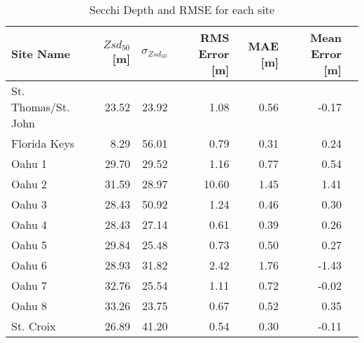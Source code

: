 \begin{table}
    \centering
    \caption{Secchi Depth and RMSE for each site}
    \label{tab:ocean_color_summary_by_site}
    \begin{tabular}{lrrrrrr}
        \toprule
        {}                  
        Site Name           & $Zsd_{50}$[m] & $\sigma_{Zsd_{50}}$ & RMS Error [m] & MAE [m] & Mean Error [m] \\
        \midrule
        St. Thomas/St. John & 23.52         & 23.92                  & 1.08          & 0.56    & -0.17          \\
        Florida Keys        & 8.29          & 56.01                  & 0.79          & 0.31    & 0.24           \\
        Oahu 1              & 29.70         & 29.52                  & 1.16          & 0.77    & 0.54           \\
        Oahu 2              & 31.59         & 28.97                  & 10.60         & 1.45    & 1.41           \\
        Oahu 3              & 28.43         & 50.92                  & 1.24          & 0.46    & 0.30           \\
        Oahu 4              & 28.43         & 27.14                  & 0.61          & 0.39    & 0.26           \\
        Oahu 5              & 29.84         & 25.48                  & 0.73          & 0.50    & 0.27           \\
        Oahu 6              & 28.93         & 31.82                  & 2.42          & 1.76    & -1.43          \\
        Oahu 7              & 32.76         & 25.54                  & 1.11          & 0.72    & -0.02          \\
        Oahu 8              & 33.26         & 23.75                  & 0.67          & 0.52    & 0.35           \\
        St. Croix           & 26.89         & 41.20                  & 0.54          & 0.30    & -0.11          \\
        \bottomrule
    \end{tabular}
\end{table}
